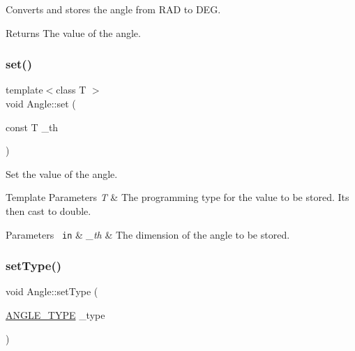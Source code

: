 Converts and stores the angle from R\+AD to D\+EG. 

\begin{DoxyReturn}{Returns}
The value of the angle. 
\end{DoxyReturn}
\mbox{\label{class_angle_a41d5a0188663cb0178b0e9e0628ea00c}} 
\subsubsection{\texorpdfstring{set()}{set()}}
{\footnotesize\ttfamily template$<$class T $>$ \\
void Angle\+::set (\begin{DoxyParamCaption}\item[{const T}]{\+\_\+th }\end{DoxyParamCaption})\hspace{0.3cm}{\ttfamily [inline]}}



Set the value of the angle. 


\begin{DoxyTemplParams}{Template Parameters}
{\em T} & The programming type for the value to be stored. It\textquotesingle{}s then cast to {\ttfamily double}. \\
\hline
\end{DoxyTemplParams}

\begin{DoxyParams}[1]{Parameters}
\mbox{\texttt{ in}}  & {\em \+\_\+th} & The dimension of the angle to be stored. \\
\hline
\end{DoxyParams}
\mbox{\label{class_angle_a831ac6c6d607545b82f129a4d8f15a8e}} 
\subsubsection{\texorpdfstring{setType()}{setType()}}
{\footnotesize\ttfamily void Angle\+::set\+Type (\begin{DoxyParamCaption}\item[{\mbox{\hyperlink{class_angle_a4f7b9849ce8780bcba95ca3ee45cff77}{A\+N\+G\+L\+E\+\_\+\+T\+Y\+PE}}}]{\+\_\+type }\end{DoxyParamCaption})\hspace{0.3cm}{\ttfamily [inline]}}



